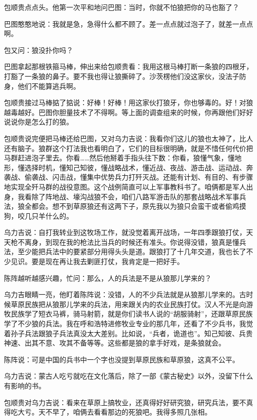 \par 包顺贵点点头。他第一次平和地问巴图：当时，你就不怕狼把你的马也豁了？
\par 巴图憨憨地说：我就是急，急得什么都不顾了。差一点点就过泡子了，就差一点点啊。
\par 包又问：狼没扑你吗？
\par 巴图拿起那根铁箍马棒，伸出来给包顺贵看：我用这根马棒打断一条狼的四根牙，打豁了一条狼的鼻子。要不我也得让狼撕碎了。沙茨楞他们没这家伙，没法子防身，他们不能算逃兵啊。
\par 包顺贵接过马棒掂了掂说：好棒！好棒！用这家伙打狼牙，你也够毒的。好！对狼越毒越好。巴图你胆量技术了不得啊。等上面的调查组来的时候，你再跟他们好好说说你是怎么打的狼。
\par 包顺贵说完便把马棒还给巴图，又对乌力吉说：我看你们这儿的狼也太神了，比人还有脑子。狼群这个打法我也看明白了，它们的目标很明确，就是不惜任何代价把马群赶进泡子里去。你看……然后他掰着手指头往下数：你看，狼懂气象，懂地形，懂选择时机，懂知己知彼，懂战略战术，懂近战、夜战、游击战、运动战、奔袭战、偷袭战、闪击战，懂集中优势兵力打歼灭战。还能有计划、有目的、有步骤地实现全歼马群的战役意图。这个战例简直可以上军事教科书了。咱俩都是军人出身，我看除了阵地战、壕沟战狼不会，咱们八路军游击队的那套战略战术军事兵法，狼全都会。想不到草原狼还有这两下子，原先我以为狼只会蛮干或者偷鸡摸狗，咬几只羊什么的。
\par 乌力吉说：自打我转业到这牧场工作，就没觉着离开战场，一年四季跟狼打仗，天天枪不离身，到现在我的枪法比当兵的时候还有准头。你说得没错，狼真是懂兵法，至少能把兵法中的要紧部分用得头头是道。跟狼打了十几年交道，我也长了不少见识。要是现在再让我去剿匪打仗，我肯定是一把好手。
\par 陈阵越听越感兴趣，忙问：那么，人的兵法是不是从狼那儿学来的？
\par 乌力吉眼睛一亮，他盯着陈阵说：没错，人的不少兵法就是从狼那儿学来的。古时候草原民族把从狼那儿学来的兵法，用来跟关内的农业民族打仗。汉人不光是向游牧民族学了短衣马裤，骑马射箭，就是你们读书人说的“胡服骑射”，还跟草原民族学了不少狼的兵法。我在呼和浩特进修牧业专业的那几年，还看了不少兵书，我觉着孙子兵法跟狼子兵法真没太大差别。比如说，“兵者，诡道也”。知己知彼、兵贵神速、出其不意、攻其不备等等。这些都是狼的拿手好戏，是条狼就会。
\par 陈阵说：可是中国的兵书中一个字也没提到草原民族和草原狼，这真不公平。
\par 乌力吉说：蒙古人吃亏就吃在文化落后，除了一部《蒙古秘史》以外，没留下什么有影响的书。
\par 包顺贵对乌力吉说：看来在草原上搞牧业，还真得好好研究狼，研究兵法，要不真得吃大亏。天不早了，咱俩去看看那边的死狼吧。我得多照几张相。
